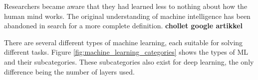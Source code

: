 \documentclass{article}
\begin{document}
Researchers became aware that they had learned less to nothing about how the human mind works. The original understanding of machine intelligence has been abandoned in search for a more complete definition. \textbf{chollet google artikkel}

There are several different types of machine learning, each suitable for solving different tasks. Figure \ref{fig:machine_learning_categories} shows the types of ML and their subcategories. These subcategories also exist for deep learning, the only difference being the number of layers used.

 
\end{document}
